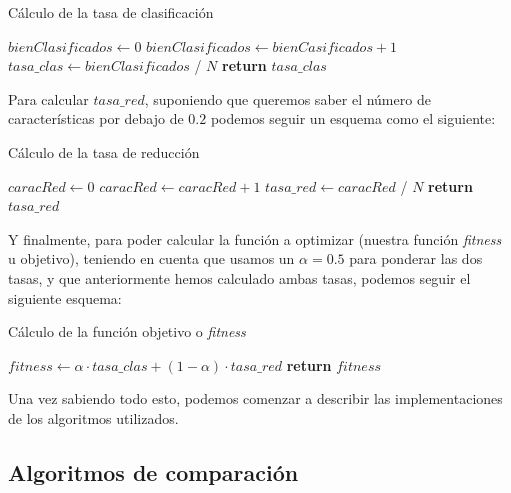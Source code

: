 \documentclass[11pt,a4paper]{article}
\begin{document}
\begin{algorithm}[H]
\caption{Cálculo de la tasa de clasificación}
\begin{algorithmic}[1]
\State $bienClasificados \gets 0$
		\State $bienClasificados \gets bienCasificados + 1$
	\EndIf
\EndFor
\State $tasa\_clas \gets bienClasificados$ / $N$
\State \textbf{return} $tasa\_clas$
\EndFunction
\end{algorithmic}
\end{algorithm}

Para calcular $tasa\_red$, suponiendo que queremos saber el número de características por debajo de $0.2$ podemos seguir un
esquema como el siguiente:

\begin{algorithm}[H]
\caption{Cálculo de la tasa de reducción}
\begin{algorithmic}[1]
\State $caracRed \gets 0$
		\State $caracRed \gets caracRed + 1$
	\EndIf
\EndFor
\State $tasa\_red \gets caracRed$ / $N$
\State \textbf{return} $tasa\_red$
\EndFunction
\end{algorithmic}
\end{algorithm}

Y finalmente, para poder calcular la función a optimizar (nuestra función \textit{fitness} u objetivo), teniendo en cuenta que
usamos un $\alpha = 0.5$ para ponderar las dos tasas, y que anteriormente hemos calculado ambas tasas, podemos seguir el
siguiente esquema:

\begin{algorithm}[H]
\caption{Cálculo de la función objetivo o \textit{fitness}}
\begin{algorithmic}[1]
\State $fitness \gets \alpha \cdot tasa\_clas + (1 - \alpha) \cdot tasa\_red$
\State \textbf{return} $fitness$
\EndFunction
\end{algorithmic}
\end{algorithm}

Una vez sabiendo todo esto, podemos comenzar a describir las implementaciones de los algoritmos utilizados.

\subsection{Algoritmos de comparación}
\end{document}
